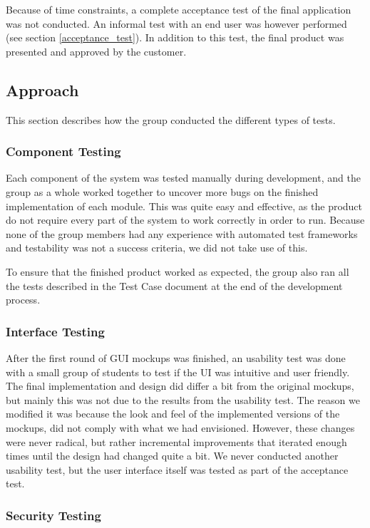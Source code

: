\noindent
Because of time constraints, a complete acceptance test of the final application was not conducted. An informal test with an end user was however performed (see section \ref{acceptance_test}). In addition to this test, the final product was presented and approved by the customer.

\subsection{Approach}
This section describes how the group conducted the different types of tests.

\subsubsection{Component Testing}
Each component of the system was tested manually during development, and the group as a whole worked together to uncover more bugs on the finished implementation of each module. This was quite easy and effective, as the product do not require every part of the system to work correctly in order to run. Because none of the group members had any experience with automated test frameworks and testability was not a success criteria, we did not take use of this.

To ensure that the finished product worked as expected, the group also ran all the tests described in the Test Case document at the end of the development process. 

\subsubsection{Interface Testing}

After the first round of GUI mockups was finished, an usability test was done with a small group of students to test if the UI was intuitive and user friendly. The final implementation and design did differ a bit from the original mockups, but mainly this was not due to the results from the usability test. The reason we modified it was because the look and feel of the implemented versions of the mockups, did not comply with what we had envisioned. However, these changes were never radical, but rather incremental improvements that iterated enough times until the design had changed quite a bit. We never conducted another usability test, but the user interface itself was tested as part of the acceptance test.

\subsubsection{Security Testing}

